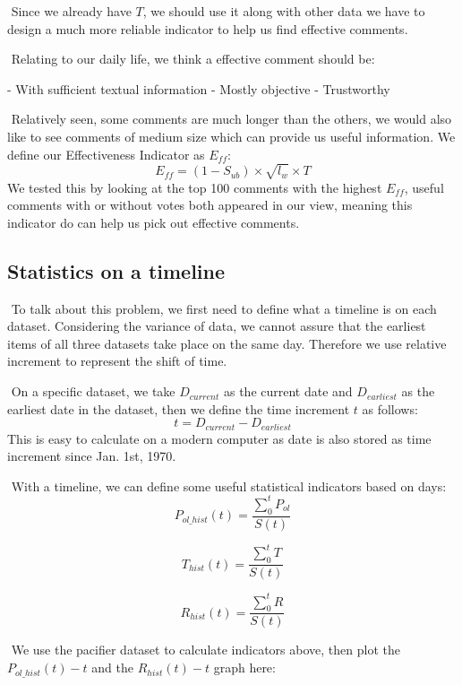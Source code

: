 \documentclass[12pt]{article}  %
\begin{document}
​		Since we already have $T$, we should use it along with other data we have to design a much more reliable indicator to help us find effective comments.

​		Relating to our daily life, we think a effective comment should be:

- With sufficient textual information
- Mostly objective
- Trustworthy

​		Relatively seen, some comments are much longer than the others, we would also like to see comments of medium size which can provide us useful information. We define our Effectiveness Indicator as $E_{ff}$:
$$
E_{ff}=(1-S_{ub}) \times \sqrt{l_{w}}\times T
$$
​		We tested this by looking at the top 100 comments with the highest $E_{ff}$, useful comments with or without votes both appeared in our view, meaning this indicator do can help us pick out effective comments.



\subsection{Statistics on a timeline}

​		To talk about this problem, we first need to define what a timeline is on each dataset. Considering the variance of data, we cannot assure that the earliest items of all three datasets take place on the same day. Therefore we use relative increment to represent the shift of time.

​		On a specific dataset, we take $D_{current}$ as the current date and $D_{earliest}$ as the earliest date in the dataset, then we define the time increment $t$ as follows:
$$
t = D_{current} - D_{earliest}
$$
​		This is easy to calculate on a modern computer as date is also stored as time increment since Jan. 1st, 1970.

​		With a timeline, we can define some useful statistical indicators based on days:
$$
P_{ol\_hist}(t) = \frac{\sum_{0}^{t} P_{ol}}{S(t)}
$$

$$
T_{hist}(t) = \frac{\sum_{0}^{t} T}{S(t)}
$$

$$
R_{hist}(t) = \frac{\sum_{0}^{t} R}{S(t)}
$$

​		We use the pacifier dataset to calculate indicators above, then plot the $P_{ol\_hist}(t)-t$ and the $R_{hist}(t)-t$ graph here:
\end{document}
